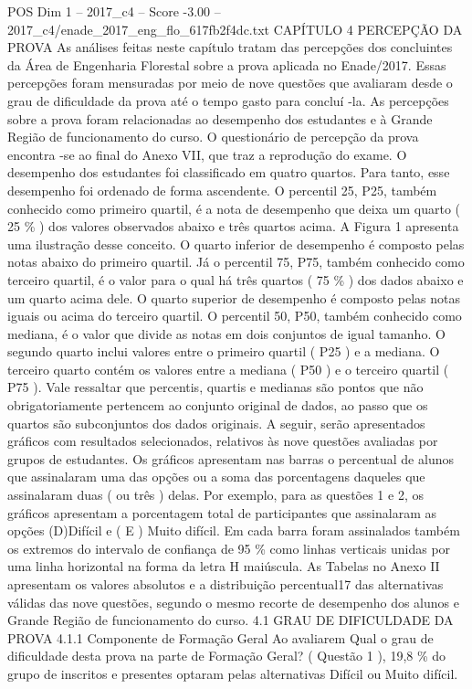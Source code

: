 \begin{textsample}{POS Dim 1 – 2017\_c4 – Score -3.00 – 2017\_c4/enade\_2017\_eng\_flo\_617fb2f4dc.txt}  \label{ex:f1_pos_274}
CAPÍTULO 4 PERCEPÇÃO DA PROVA As análises feitas neste capítulo tratam das percepções dos concluintes da Área de Engenharia Florestal sobre a prova aplicada no Enade/2017.
Essas percepções foram mensuradas por meio de nove questões que avaliaram desde o grau de dificuldade da prova até o tempo gasto para concluí -la.
As percepções sobre a prova foram relacionadas ao desempenho dos estudantes e à Grande Região de funcionamento do curso.
O questionário de percepção da prova encontra -se ao final do Anexo VII, que traz a reprodução do exame.
O desempenho dos estudantes foi classificado em quatro quartos.
Para tanto, esse desempenho foi ordenado de forma ascendente.
O percentil 25, P25, também conhecido como primeiro quartil, é a nota de desempenho que deixa um quarto ( 25 \% ) dos valores observados abaixo e três quartos acima.
A Figura 1 apresenta uma ilustração desse conceito.
O quarto inferior de desempenho é composto pelas notas abaixo do primeiro quartil.
Já o percentil 75, P75, também conhecido como terceiro quartil, é o valor para o qual há três quartos ( 75 \% ) dos dados abaixo e um quarto acima dele.
O quarto superior de desempenho é composto pelas notas iguais ou acima do terceiro quartil.
O percentil 50, P50, também conhecido como mediana, é o valor que divide as notas em dois conjuntos de igual tamanho.
O segundo quarto inclui valores entre o primeiro quartil ( P25 ) e a mediana.
O terceiro quarto contém os valores entre a mediana ( P50 ) e o terceiro quartil ( P75 ).
Vale ressaltar que percentis, quartis e medianas são pontos que não obrigatoriamente pertencem ao conjunto original de dados, ao passo que os quartos são subconjuntos dos dados originais.
A seguir, serão apresentados gráficos com resultados selecionados, relativos às nove questões avaliadas por grupos de estudantes.
Os gráficos apresentam nas barras o percentual de alunos que assinalaram uma das opções ou a soma das porcentagens daqueles que assinalaram duas ( ou três ) delas.
Por exemplo, para as questões 1 e 2, os gráficos apresentam a porcentagem total de participantes que assinalaram as opções (D)Difícil e ( E ) Muito difícil.
Em cada barra foram assinalados também os extremos do intervalo de confiança de 95 \% como linhas verticais unidas por uma linha horizontal na forma da letra H maiúscula.
As Tabelas no Anexo II apresentam os valores absolutos e a distribuição percentual17 das alternativas válidas das nove questões, segundo o mesmo recorte de desempenho dos alunos e Grande Região de funcionamento do curso. 4.1 GRAU DE DIFICULDADE DA PROVA 4.1.1 Componente de Formação Geral Ao avaliarem Qual o grau de dificuldade desta prova na parte de Formação Geral? ( Questão 1 ), 19,8 \% do grupo de inscritos e presentes optaram pelas alternativas Difícil ou Muito difícil.

\end{textsample}
